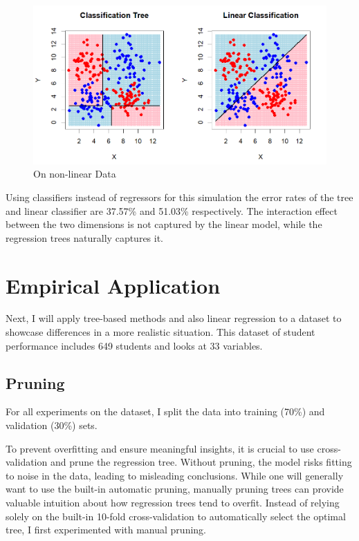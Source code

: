 \documentclass[12pt]{article}
\begin{document}
\begin{figure}
    \centering
    \includegraphics[scale=0.30]{NLD Pred.png}
    \caption{On non-linear Data}
\end{figure}

Using classifiers instead of regressors for this simulation the error rates of the tree and linear classifier are 37.57\% and 51.03\% respectively. The interaction effect between the two dimensions is not captured by the linear model, while the regression trees naturally captures it.


\section{Empirical Application}

Next, I will apply tree-based methods and also linear regression to a dataset to showcase differences in a more realistic situation. This dataset of student performance includes 649 students and looks at 33 variables.


\subsection{Pruning}

For all experiments on the dataset, I split the data into training (70\%) and validation (30\%) sets.

To prevent overfitting and ensure meaningful insights, it is crucial to use cross-validation and prune the regression tree. Without pruning, the model risks fitting to noise in the data, leading to misleading conclusions. While one will generally want to use the built-in automatic pruning, manually pruning trees can provide valuable intuition about how regression trees tend to overfit. Instead of relying solely on the built-in 10-fold cross-validation to automatically select the optimal tree, I first experimented with manual pruning.
\end{document}
